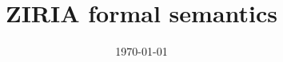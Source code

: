 \documentclass[nocopyrightspace,preprint,onecolumn,10pt]{sigplanconf}  %
\theoremstyle{remark}
\theoremstyle{definition}
\theoremstyle{plain}
\begin{document}
 




\title{ZIRIA formal semantics}

\date{\today} 






\authorinfo{}{}{}
%


\maketitle
\makeatactive 

\newcommand{\pair}[2]{\langle #1; #2 \rangle}


\newcommand{\Used}{U}
\newcommand{\HeadUsed}{H}
\newcommand{\Called}[2]{C^{#1}\!(#2)}
\newcommand{\Absent}{A}

\newcommand{\lang}{\lambda_{HS}^{A}}
\newcommand{\letup}{{\tt let}_{\Uparrow}}
\newcommand{\letdn}{{\tt let}_{\Downarrow}}
\newcommand{\triple}[3]{\langle #1; #2; #3 \rangle}


\end{document}
